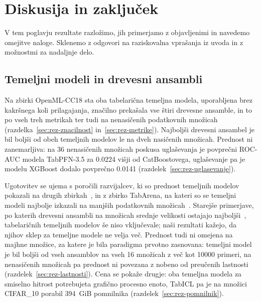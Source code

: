 \documentclass[a4paper,12pt,openright]{book}
\begin{document}
\chapter{Diskusija in zaključek}
\label{ch:zakljucek}

V tem poglavju rezultate razložimo, jih primerjamo z objavljenimi in navedemo
omejitve naloge. Sklenemo z odgovori na raziskovalna vprašanja iz uvoda in z
možnostmi za nadaljnje delo.

\section{Temeljni modeli in drevesni ansambli}
\label{sec:disk-cc18}

Na zbirki OpenML-CC18 sta oba tabelarična temeljna modela, uporabljena brez
kakršnega koli prilagajanja, značilno prekašala vse štiri drevesne ansamble, in
to po vseh treh metrikah ter tudi na nenasičenih podatkovnih množicah
(razdelka~\ref{sec:rez-znacilnost} in~\ref{sec:rez-metrike}). Najboljši
drevesni ansambel je bil boljši od obeh temeljnih modelov le na dveh nasičenih
množicah. Prednost ni zanemarljiva: na 36 nenasičenih množicah poskusa
uglaševanja je povprečni ROC-AUC modela TabPFN-3.5 za \num{0.0224} višji od
CatBoostovega, uglaševanje pa je modelu XGBoost dodalo povprečno \num{0.0141}
(razdelek~\ref{sec:rez-uglasevanje}).

Ugotovitev se ujema s poročili razvijalcev, ki so prednost temeljnih modelov
pokazali na drugih zbirkah~\cite{grinsztajn2025tabpfn25,grinsztajn2026tabpfn3,qu2025tabicl},
in z zbirko TabArena, na kateri so se temeljni modeli najbolje izkazali na
manjših podatkovnih množicah~\cite{erickson2025tabarena}. Starejše
primerjave, po katerih drevesni ansambli na množicah srednje velikosti ostajajo
najboljši~\cite{grinsztajn2022why}, tabelaričnih temeljnih modelov še niso
vključevale; naši rezultati kažejo, da njihov sklep za temeljne modele ne velja
več. Prednost tudi ni omejena na majhne množice, za katere je bila paradigma
prvotno zasnovana: temeljni model je bil boljši od vseh ansamblov na vseh 16
množicah z več kot \num{10000} primeri, na nenasičenih množicah pa prednost ni
povezana z nobeno od preučenih lastnosti (razdelek~\ref{sec:rez-lastnosti}).
Cena se pokaže drugje: oba temeljna modela za smiselno hitrost potrebujeta
grafično procesno enoto, TabICL pa je na množici CIFAR\_10 porabil 394~GiB
pomnilnika (razdelek~\ref{sec:rez-pomnilnik}).
\end{document}
